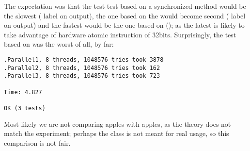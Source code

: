 The expectation was that the test test based on a synchronized method
would be the slowest ( label on output), the one based on
the  would become second ( label on
output) and the fastest would be the one based on 
(); as the latest is likely to take advantage of hardware
atomic instruction of 32bits. Surprisingly, the test based on
 was the worst of all, by far: \\

\begin{verbatim}
.Parallel1, 8 threads, 1048576 tries took 3878
.Parallel2, 8 threads, 1048576 tries took 162
.Parallel3, 8 threads, 1048576 tries took 723

Time: 4.827

OK (3 tests)
\end{verbatim}
\hfill

Most likely we are not comparing apples with apples, as the theory
does not match the experiment; perhaps the  class is
not meant for real usage, so this comparison is not fair.





